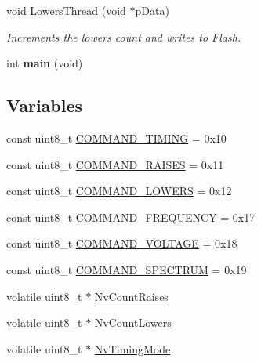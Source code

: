 \begin{DoxyCompactItemize}
void \hyperlink{group__main__module_ga58206eaf11b86e19e48708e5d3e5cc3f}{Lowers\+Thread} (void $\ast$p\+Data)
\begin{DoxyCompactList}\small\item\em Increments the lowers count and writes to Flash. \end{DoxyCompactList}\item 
\hypertarget{group__main__module_ga840291bc02cba5474a4cb46a9b9566fe}{}int {\bfseries main} (void)\label{group__main__module_ga840291bc02cba5474a4cb46a9b9566fe}

\end{DoxyCompactItemize}
\subsection*{Variables}
\begin{DoxyCompactItemize}
\item 
const uint8\+\_\+t \hyperlink{group__main__module_gab8928c10e70b1b264be7ff2809bdbafc}{C\+O\+M\+M\+A\+N\+D\+\_\+\+T\+I\+M\+I\+N\+G} = 0x10
\item 
const uint8\+\_\+t \hyperlink{group__main__module_ga458112a297f29bcedf862af9fee21352}{C\+O\+M\+M\+A\+N\+D\+\_\+\+R\+A\+I\+S\+E\+S} = 0x11
\item 
const uint8\+\_\+t \hyperlink{group__main__module_ga3950ac4d5a4f4c540f6856a4ad463e14}{C\+O\+M\+M\+A\+N\+D\+\_\+\+L\+O\+W\+E\+R\+S} = 0x12
\item 
const uint8\+\_\+t \hyperlink{group__main__module_gad03f9b44ebc48c9db63337935fcaf46e}{C\+O\+M\+M\+A\+N\+D\+\_\+\+F\+R\+E\+Q\+U\+E\+N\+C\+Y} = 0x17
\item 
const uint8\+\_\+t \hyperlink{group__main__module_ga793f5eac55477efb909e878b3021f765}{C\+O\+M\+M\+A\+N\+D\+\_\+\+V\+O\+L\+T\+A\+G\+E} = 0x18
\item 
const uint8\+\_\+t \hyperlink{group__main__module_gae55bd8263a510b359f8b4ebca3e6a91d}{C\+O\+M\+M\+A\+N\+D\+\_\+\+S\+P\+E\+C\+T\+R\+U\+M} = 0x19
\item 
volatile uint8\+\_\+t $\ast$ \hyperlink{group__main__module_ga515a64111062904ebde3d38b51d1d7d2}{Nv\+Count\+Raises}
\item 
volatile uint8\+\_\+t $\ast$ \hyperlink{group__main__module_ga5f7c64789a946f4a8d7c20e94b875f30}{Nv\+Count\+Lowers}
\item 
volatile uint8\+\_\+t $\ast$ \hyperlink{group__main__module_ga56dcc37aec297d091908aa8c6c90a89e}{Nv\+Timing\+Mode}
\end{DoxyCompactItemize}


